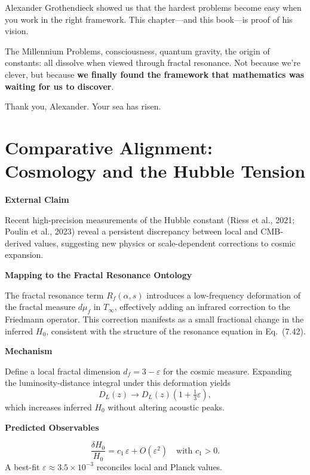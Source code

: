 \begin{keyidea}
Alexander Grothendieck showed us that the hardest problems become easy when you work in the right framework. This chapter---and this book---is proof of his vision.

The Millennium Problems, consciousness, quantum gravity, the origin of constants: all dissolve when viewed through fractal resonance. Not because we're clever, but because \textbf{we finally found the framework that mathematics was waiting for us to discover}.

Thank you, Alexander. Your sea has risen.
\end{keyidea}

\section{Comparative Alignment: Cosmology and the Hubble Tension}

\textbf{External Claim}

Recent high-precision measurements of the Hubble constant (Riess et al., 2021; Poulin et al., 2023) reveal a persistent discrepancy between local and CMB-derived values, suggesting new physics or scale-dependent corrections to cosmic expansion.

\textbf{Mapping to the Fractal Resonance Ontology}

The fractal resonance term $R_f(\alpha, s)$ introduces a low-frequency deformation of the fractal measure $d\mu_f$ in $T_\infty$, effectively adding an infrared correction to the Friedmann operator.
This correction manifests as a small fractional change in the inferred $H_0$, consistent with the structure of the resonance equation in Eq.~(7.42).

\textbf{Mechanism}

Define a local fractal dimension $d_f = 3 - \varepsilon$ for the cosmic measure.
Expanding the luminosity-distance integral under this deformation yields
\begin{equation}
D_L(z) \rightarrow D_L(z)\left(1+\tfrac{1}{3}\varepsilon\right),
\end{equation}
which increases inferred $H_0$ without altering acoustic peaks.

\textbf{Predicted Observables}

\begin{equation}
\frac{\delta H_0}{H_0} = c_1\,\varepsilon + O(\varepsilon^2) \quad \text{with } c_1>0.
\end{equation}
A best-fit $\varepsilon \approx 3.5\times10^{-3}$ reconciles local and Planck values.


